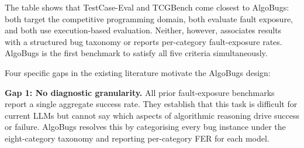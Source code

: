 \begin{table}[h!]
\centering
\caption{Comparison of existing benchmarks and their limitations relative to AlgoBugs.}
\label{tab:gap_analysis}
\renewcommand{\arraystretch}{1.3}
\end{table}

The table shows that TestCase-Eval and TCGBench come closest to AlgoBugs: both target the competitive programming domain, both evaluate fault exposure, and both use execution-based evaluation. Neither, however, associates results with a structured bug taxonomy or reports per-category fault-exposure rates. AlgoBugs is the first benchmark to satisfy all five criteria simultaneously.

Four specific gaps in the existing literature motivate the AlgoBugs design:

\textbf{Gap 1: No diagnostic granularity.} All prior fault-exposure benchmarks report a single aggregate success rate. They establish that this task is difficult for current LLMs but cannot say which aspects of algorithmic reasoning drive success or failure. AlgoBugs resolves this by categorising every bug instance under the eight-category taxonomy and reporting per-category FER for each model.

